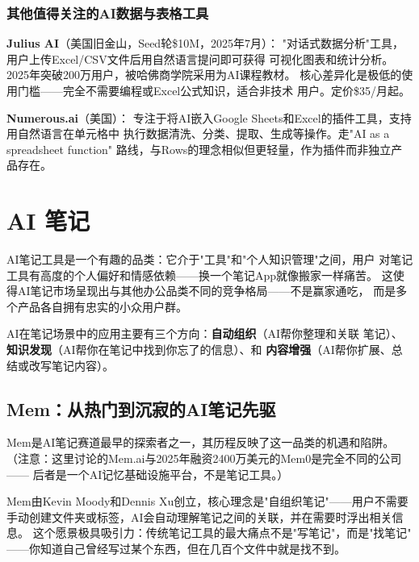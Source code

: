 \subsubsection{其他值得关注的AI数据与表格工具}

\textbf{Julius AI}（美国旧金山，Seed轮\$10M，2025年7月）：
"对话式数据分析"工具，用户上传Excel/CSV文件后用自然语言提问即可获得
可视化图表和统计分析。2025年突破200万用户，被哈佛商学院采用为AI课程教材。
核心差异化是极低的使用门槛——完全不需要编程或Excel公式知识，适合非技术
用户。定价\$35/月起。

\textbf{Numerous.ai}（美国）：
专注于将AI嵌入Google Sheets和Excel的插件工具，支持用自然语言在单元格中
执行数据清洗、分类、提取、生成等操作。走"AI as a spreadsheet function"
路线，与Rows的理念相似但更轻量，作为插件而非独立产品存在。



\section{AI 笔记}
\label{sec:cprod-notes}

AI笔记工具是一个有趣的品类：它介于"工具"和"个人知识管理"之间，用户
对笔记工具有高度的个人偏好和情感依赖——换一个笔记App就像搬家一样痛苦。
这使得AI笔记市场呈现出与其他办公品类不同的竞争格局——不是赢家通吃，
而是多个产品各自拥有忠实的小众用户群。

AI在笔记场景中的应用主要有三个方向：\textbf{自动组织}（AI帮你整理和关联
笔记）、\textbf{知识发现}（AI帮你在笔记中找到你忘了的信息）、和
\textbf{内容增强}（AI帮你扩展、总结或改写笔记内容）。

\subsection{Mem：从热门到沉寂的AI笔记先驱}
\label{subsec:mem}

Mem是AI笔记赛道最早的探索者之一，其历程反映了这一品类的机遇和陷阱。
（注意：这里讨论的Mem.ai与2025年融资2400万美元的Mem0是完全不同的公司——
后者是一个AI记忆基础设施平台，不是笔记工具。）

Mem由Kevin Moody和Dennis Xu创立，核心理念是"自组织笔记"——用户不需要
手动创建文件夹或标签，AI会自动理解笔记之间的关联，并在需要时浮出相关信息。
这个愿景极具吸引力：传统笔记工具的最大痛点不是"写笔记"，而是"找笔记"
——你知道自己曾经写过某个东西，但在几百个文件中就是找不到。


